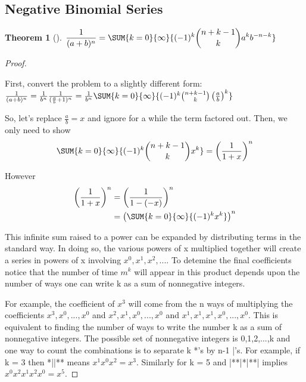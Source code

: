 \documentclass[10pt,]{book}
\theoremstyle{plain}
\newtheorem{theorem}{Theorem}[section]
\theoremstyle{definition}
\theoremstyle{definition}
\numberwithin{equation}{section}
\begin{document}
\subsection[Negative Binomial Series]{Negative Binomial Series}\label{subsection-20}
\begin{theorem}[]\label{theorem-NegBinomSeries}
\(\displaystyle \frac{1}{(a+b)^n} = \SUM {k=0} {\infty} {(-1)^k \binom{n + k - 1}{k} a^k b^{-n-k}}\)\end{theorem}
\begin{proof}\hypertarget{proof-12}{}
First, convert the problem to a slightly different form:%
\( \frac{1}{(a+b)^n} = \frac{1}{b^n} \frac{1}{(\frac{a}{b}+1)^n} 
							 = \frac{1}{b^n} \SUM {k=0} {\infty} {(-1)^k \binom{n + k - 1}{k} \left ( \frac{a}{b} \right ) ^k}
				\)\par
So, let's replace \(\frac{a}{b} = x\) and ignore for a while the term factored out. Then, we only need to show %
\begin{gather*}
\SUM {k=0} {\infty} {(-1)^k \binom{n + k - 1}{k} x^k} = \left ( \frac{1}{1+x} \right )^n 
\end{gather*}\par
However%
\begin{align*}
 \left ( \frac{1}{1+x} \right )^n & = \left ( \frac{1}{1 - (-x)} \right )^n \\
 & = \left ( \SUM {k=0} {\infty} {(-1)^k x^k} \right )^n
\end{align*}\par
This infinite sum raised to a power can be expanded by distributing terms in the standard way. 
				In doing so, the various powers of x multiplied together
				will create a series in powers of x involving \(x^0, x^1, x^2, ...\).  
				To detemine the final coefficients notice that the number of time \(m^k\) will 
				appear in this product depends upon the number of ways one can write k as a sum of nonnegative integers.%
\par
For example, the coefficient of \(x^3\) will come from the n ways of multiplying the coefficients 
				\(x^3, x^0, ..., x^0\) and \(x^2, x^1, x^0, ..., x^0\)
				 and \(x^1, x^1, x^1, x^0,..., x^0\). This is equivalent to finding the number of ways to write the 
				 number k as a sum of nonnegative integers. The possible set of
				 nonnegative integers is {0,1,2,...,k} and one way to count the combinations is to separate k *'s by n-1 |'s.  
				 For example, if k = 3 then *||** means 
				 \(x^1 x^0 x^2 = x^3\). Similarly for k = 5 and |**|*|**| implies \( x^0 x^2 x^1 x^2 x^0 = x^5\). 

\end{proof}
\end{document}
